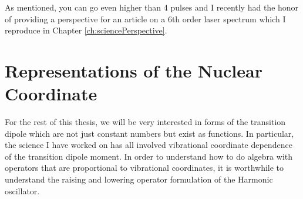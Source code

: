 As mentioned, you can go even higher than 4 pulses and I recently had the honor of providing a perspective for an article on a 6th order laser spectrum which I reproduce in Chapter \ref{ch:sciencePerspective}.


\section{Representations of the Nuclear Coordinate}
For the rest of this thesis, we will be very interested in forms of the transition dipole which are not just constant numbers but exist as functions.  In particular, the science I have worked on has all involved vibrational coordinate dependence of the transition dipole moment.  In order to understand how to do algebra with operators that are proportional to vibrational coordinates, it is worthwhile to understand the raising and lowering operator formulation of the Harmonic oscillator.

